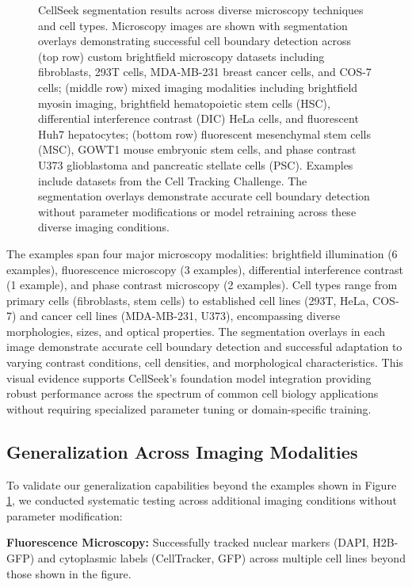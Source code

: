 \documentclass[../cellseek_paper.tex]{subfiles}
\begin{document}
\begin{figure}[H]
  \caption{CellSeek segmentation results across diverse microscopy techniques and cell types. Microscopy images are shown with segmentation overlays demonstrating successful cell boundary detection across (top row) custom brightfield microscopy datasets including fibroblasts, 293T cells, MDA-MB-231 breast cancer cells, and COS-7 cells; (middle row) mixed imaging modalities including brightfield myosin imaging, brightfield hematopoietic stem cells (HSC), differential interference contrast (DIC) HeLa cells, and fluorescent Huh7 hepatocytes; (bottom row) fluorescent mesenchymal stem cells (MSC), GOWT1 mouse embryonic stem cells, and phase contrast U373 glioblastoma and pancreatic stellate cells (PSC). Examples include datasets from the Cell Tracking Challenge. The segmentation overlays demonstrate accurate cell boundary detection without parameter modifications or model retraining across these diverse imaging conditions.}
  \label{fig:generalization_examples}
\end{figure}

The examples span four major microscopy modalities: brightfield illumination (6 examples), fluorescence microscopy (3 examples), differential interference contrast (1 example), and phase contrast microscopy (2 examples). Cell types range from primary cells (fibroblasts, stem cells) to established cell lines (293T, HeLa, COS-7) and cancer cell lines (MDA-MB-231, U373), encompassing diverse morphologies, sizes, and optical properties. The segmentation overlays in each image demonstrate accurate cell boundary detection and successful adaptation to varying contrast conditions, cell densities, and morphological characteristics. This visual evidence supports CellSeek's foundation model integration providing robust performance across the spectrum of common cell biology applications without requiring specialized parameter tuning or domain-specific training.

\subsection{Generalization Across Imaging Modalities}

To validate our generalization capabilities beyond the examples shown in Figure \ref{fig:generalization_examples}, we conducted systematic testing across additional imaging conditions without parameter modification:

\textbf{Fluorescence Microscopy:} Successfully tracked nuclear markers (DAPI, H2B-GFP) and cytoplasmic labels (CellTracker, GFP) across multiple cell lines beyond those shown in the figure.
\end{document}
